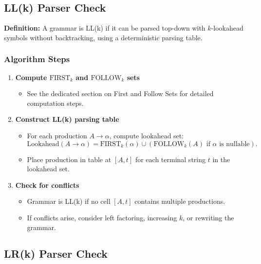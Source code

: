 \subsection{LL(k) Parser Check}

\textbf{Definition:} A grammar is LL(k) if it can be parsed top-down with \( k \)-lookahead symbols without backtracking, using a deterministic parsing table.

\subsubsection{Algorithm Steps}

\begin{enumerate}
    \item \textbf{Compute \(\text{FIRST}_k\) and \(\text{FOLLOW}_k\) sets}
    \begin{itemize}
        \item See the dedicated section on First and Follow Sets for detailed computation steps.
    \end{itemize}

    \item \textbf{Construct LL(k) parsing table}
    \begin{itemize}
        \item For each production \( A \to \alpha \), compute lookahead set:
        \[
        \text{Lookahead}(A \to \alpha) = \text{FIRST}_k(\alpha) \cup (\text{FOLLOW}_k(A) \text{ if } \alpha \text{ is nullable}).
        \]
        \item Place production in table at \( [A, t] \) for each terminal string \( t \) in the lookahead set.
    \end{itemize}

    \item \textbf{Check for conflicts}
    \begin{itemize}
        \item Grammar is LL(k) if no cell \( [A, t] \) contains multiple productions.
        \item If conflicts arise, consider left factoring, increasing \( k \), or rewriting the grammar.
    \end{itemize}
\end{enumerate}

\subsection{LR(k) Parser Check}

